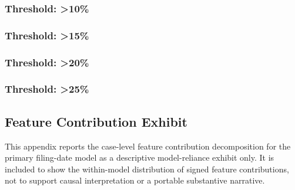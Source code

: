 \documentclass[11pt, letterpaper, oneside]{article}
\begin{document}
\clearpage
\subsubsection{Threshold: >10\%}




\clearpage
\subsubsection{Threshold: >15\%}




\clearpage
\subsubsection{Threshold: >20\%}




\clearpage
\subsubsection{Threshold: >25\%}




\clearpage
\subsection{Feature Contribution Exhibit}
\label{app:exploratory_attribution}

\noindent This appendix reports the case-level feature contribution decomposition for the primary filing-date model as a descriptive model-reliance exhibit only. It is included to show the within-model distribution of signed feature contributions, not to support causal interpretation or a portable substantive narrative.
\end{document}
